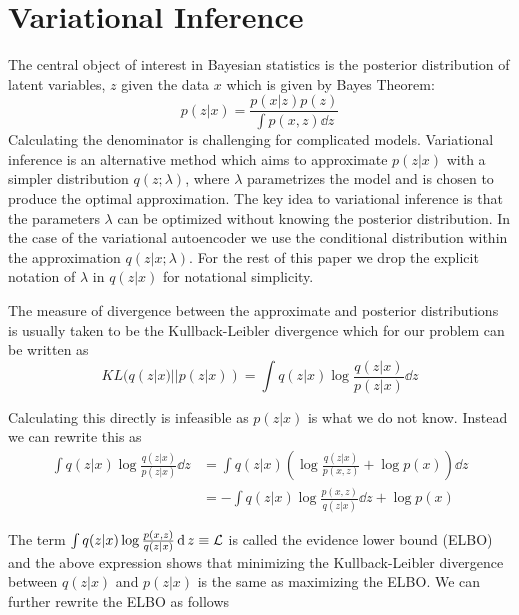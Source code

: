 \documentclass[12pt]{article}
\begin{document}
\newpage






\newpage
\appendix
\section[sec:VI]{Variational Inference}
\label{sec:VI}

The central object of interest in Bayesian statistics is the posterior distribution of latent variables, $z$ given the 
data $x$ which is given by Bayes Theorem: 
\begin{equation}
   p(z|x) = \frac{p(x|z) p(z)}{\int p(x,z) \dd z}
\end{equation}
Calculating the denominator is challenging for complicated models. Variational inference is an alternative method 
which aims to approximate $p(z|x)$ with a simpler distribution $q(z; \lambda)$, where $\lambda$ parametrizes the model
and is chosen to produce the optimal approximation. 
The key idea to variational inference is that the parameters $\lambda$ can be optimized without knowing the posterior 
distribution. In the case of the variational autoencoder we use the conditional distribution within the 
approximation $q(z|x; \lambda)$. For the rest of this paper we drop the explicit notation of $\lambda$ in $q(z|x)$ for 
notational simplicity. 

The measure of divergence between the approximate and posterior distributions is usually taken to be 
the Kullback-Leibler divergence which for our problem can be written as 
\begin{equation}
   KL(q(z|x) || p(z|x)) = \int q(z | x) \log  \frac{q(z |x)}{p(z|x)}  \dd z
\end{equation}

Calculating this directly is infeasible as $p(z|x)$ is what we do not know. Instead we can rewrite this as
\begin{align*}
   \int q(z | x) \log  \frac{q(z |x)}{p(z|x)}  \dd z &= \int q(z|x) \left(\log  \frac{q(z |x)}{p(x, z)} + \log p(x) \right) \dd z \\
   &= -\int q(z|x) \log  \frac{p(x, z)}{q(z |x)}  \dd z + \log p(x)
\end{align*}

The term $\int q(z|x) \log  \frac{p(x, z)}{q(z |x)}  \operatorname{\mathrm{d}} z \equiv \mathcal{L}$ is called the evidence lower bound (ELBO) and the above expression 
shows that minimizing the Kullback-Leibler divergence between $q(z|x)$ and  $p(z|x) $ is the same as maximizing the ELBO. We can 
further rewrite the ELBO as follows
\end{document}
